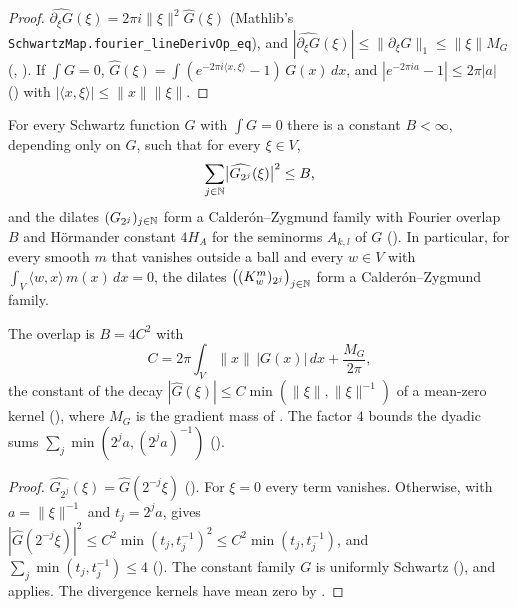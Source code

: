 \begin{proof}
\leanok
$\widehat{\partial_\xi G}(\xi) = 2 \pi i \|\xi\|^2 \widehat G(\xi)$ (Mathlib's
\texttt{SchwartzMap.\allowbreak fourier\_\allowbreak lineDerivOp\_\allowbreak eq}), and
$|\widehat{\partial_\xi G}(\xi)| \leq \|\partial_\xi G\|_1 \leq \|\xi\| M_G$
(, ). If $\int G = 0$,
$\widehat G(\xi) = \int (e^{-2 \pi i \langle x, \xi \rangle} - 1) \, G(x) \, dx$, and
$|e^{-2 \pi i a} - 1| \leq 2 \pi |a|$ () with
$|\langle x, \xi \rangle| \leq \|x\| \|\xi\|$.
\end{proof}

\begin{theorem}
\label{thm:mean-zero-cz-family}
\leanok
{}
For every Schwartz function $G$ with $\int G = 0$ there is a constant $B < \infty$, depending only
on $G$, such that for every $\xi \in V$,
\[
  \sum_{j \in \mathbb{N}} \bigl|\widehat{G_{2^j}}(\xi)\bigr|^2 \leq B ,
\]
and the dilates $(G_{2^j})_{j \in \mathbb{N}}$ form a Calder\'on--Zygmund family with Fourier overlap $B$
and H\"ormander constant $4 H_A$ for the seminorms $A_{k,l}$ of $G$ ().
In particular, for every smooth $m$ that vanishes outside a ball and every $w \in V$ with
$\int_V \langle w, x \rangle \, m(x) \, dx = 0$, the dilates
$\bigl((K^m_w)_{2^j}\bigr)_{j \in \mathbb{N}}$ form a Calder\'on--Zygmund family.
\end{theorem}

The overlap is $B = 4 C^2$ with
\[
  C = 2 \pi \int_V \|x\| \, |G(x)| \, dx + \frac{M_G}{2 \pi} ,
\]
the constant of the decay $|\widehat G(\xi)| \leq C \min(\|\xi\|, \|\xi\|^{-1})$ of a mean-zero
kernel (), where $M_G$ is the gradient mass of
. The factor $4$ bounds the dyadic sums
$\sum_j \min(2^j a, (2^j a)^{-1})$ ().

\begin{proof}
\leanok
$\widehat{G_{2^j}}(\xi) = \widehat G(2^{-j} \xi)$ (). For $\xi = 0$ every
term vanishes. Otherwise, with $a = \|\xi\|^{-1}$ and $t_j = 2^j a$, 
gives $|\widehat G(2^{-j} \xi)|^2 \leq C^2 \min(t_j, t_j^{-1})^2 \leq C^2 \min(t_j, t_j^{-1})$,
and $\sum_j \min(t_j, t_j^{-1}) \leq 4$ (). The constant family $G$ is
uniformly Schwartz (), and 
applies. The divergence kernels have mean zero by .
\end{proof}

